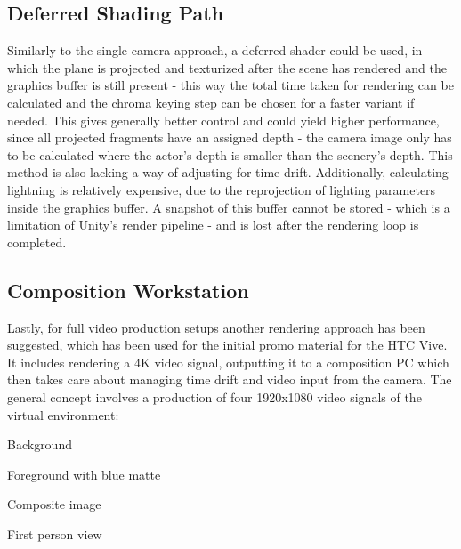 \subsection{Deferred Shading Path}

Similarly to the single camera approach, a deferred shader could be used, in 
which the plane is projected and texturized after the scene has rendered and 
the graphics buffer is still present - this way the total time taken for 
rendering can be calculated and the chroma keying step can be chosen for a 
faster variant if needed. This gives generally better control and could yield 
higher performance, since all projected fragments have an assigned depth - the 
camera image only has to be calculated where the actor's depth is smaller than 
the scenery's depth. This method is also lacking a way of adjusting for time 
drift. Additionally, calculating lightning is relatively expensive, due to the 
reprojection of lighting parameters inside the graphics buffer. A snapshot of 
this buffer cannot be stored - which is a limitation of Unity's render pipeline 
- and is lost after the rendering loop is completed.

\subsection{Composition Workstation}

Lastly, for full video production setups another rendering approach has been 
suggested, which has been used for the initial promo material for the HTC 
Vive\cite{valve:vive-trailer:2016}. It includes rendering a 4K video signal, 
outputting it to a composition PC which then takes care about managing time 
drift and video input from the camera.
\newline
The general concept involves a production of four 1920x1080 video signals of 
the virtual environment:
\begin{my_list}
	\item Background
	\item Foreground with blue matte
	\item Composite image
	\item First person view
\end{my_list}

